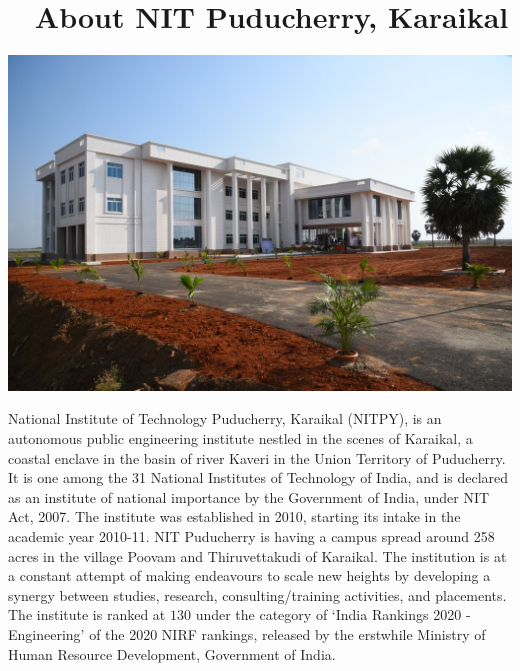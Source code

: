 \documentclass[12pt,a3paper, foldmark,notumble]{leaflet}
\begin{document}
\clearpage
\section{\faUniversity~ \textbf{About NIT Puducherry, Karaikal}}
\begin{center}
	\includegraphics[scale=0.215,trim={0cm, 14cm, 0cm, 6cm},clip]{admin.jpg}	
\end{center}
National Institute of Technology Puducherry, Karaikal (NITPY), is an autonomous public engineering institute nestled in the scenes of Karaikal, a coastal enclave in the basin of river Kaveri in the Union Territory of Puducherry. It is one among the 31 National Institutes of Technology of India, and is declared as an institute of national importance by the Government of India, under NIT Act, 2007. The institute was established in 2010, starting its intake in the academic year 2010-11. NIT Puducherry is having a campus spread around 258 acres in the village Poovam and Thiruvettakudi of Karaikal. The institution is at a constant attempt of making endeavours to scale new heights by developing a synergy between studies, research, consulting/training activities, and placements. The institute is ranked at $130$ under the category of \enquote*{India Rankings 2020 - Engineering} of the 2020 NIRF rankings, released by the erstwhile Ministry of Human Resource Development, Government of India. 
\end{document}
